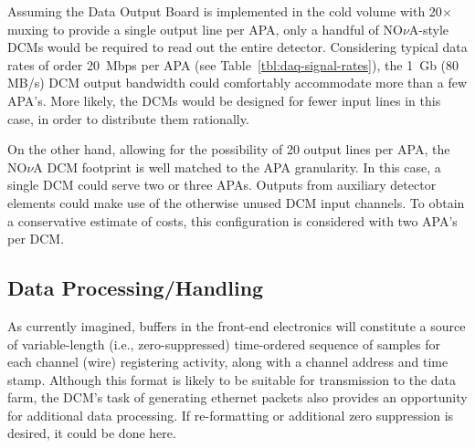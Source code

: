 Assuming the Data Output Board is implemented in the cold volume with 
20$\times$ muxing to provide a single output line per APA, only a handful 
of NO$\nu$A-style DCMs would be required to read out the entire detector.  
Considering typical data rates of order 20~Mbps per APA 
(see Table~\ref{tbl:daq-signal-rates}), the 1~Gb (80 MB/s) 
DCM output bandwidth 
could comfortably accommodate more than a few APA's.
More likely, the \LBNE DCMs would be designed for fewer input lines 
in this case, in order to distribute them rationally. 

On the other hand, allowing for the possibility of 20 output lines per APA, 
the NO$\nu$A DCM footprint is well matched to the \LBNE APA granularity.  In 
this case, a single DCM could serve two or three APAs.  Outputs from auxiliary 
detector elements could make use of the otherwise unused DCM input channels.
To obtain a conservative estimate of costs, this configuration is considered 
with two APA's per DCM.


\subsection{Data Processing/Handling}

As currently imagined, buffers in the front-end electronics will constitute  
a source of variable-length (i.e., zero-suppressed) time-ordered sequence 
of samples for each channel (wire) registering activity, along with a 
channel address and time stamp.  Although this format is likely to be 
suitable for transmission to the data farm, the DCM's task of generating 
ethernet packets also provides an opportunity for additional data processing.  
If re-formatting or additional zero suppression is desired, 
it could be done here.   



